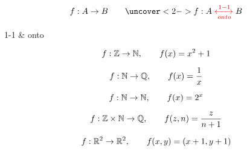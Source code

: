 \begin{frame}{}
  \begin{definition}
    \[
      f: A \to B \qquad \uncover<2->{f: A \red{\;\xleftrightarrow[onto]{1-1}\;} B}
    \]

    \begin{center}
      {1-1 \& onto}
    \end{center}
  \end{definition}
\end{frame}

\begin{frame}{}
  \[
    f: \mathbb{Z} \to \mathbb{N}, \qquad f(x) = x^2 + 1
  \]

  \pause
  \[
    f: \mathbb{N} \to \mathbb{Q}, \qquad f(x) = \frac{1}{x}
  \]

  \pause
  \[
    f: \mathbb{N} \to \mathbb{N}, \qquad f(x) = 2^{x}
  \]

  \pause
  \[
    f: \mathbb{Z} \times \mathbb{N} \to \mathbb{Q}, \qquad f(z, n) = \frac{z}{n+1}
  \]

  \pause
  \[
    f: \mathbb{R}^{2} \to \mathbb{R}^{2}, \qquad f(x,y) = (x+1, y+1)
  \]
\end{frame}


